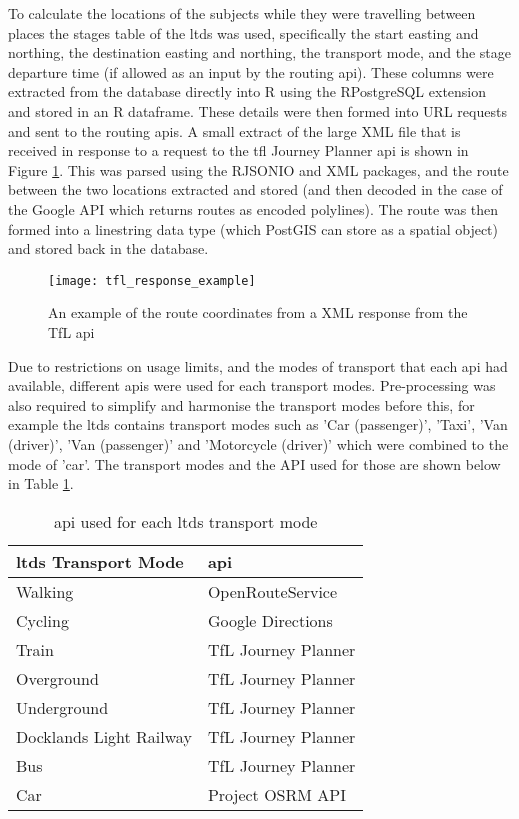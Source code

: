 To calculate the locations of the subjects while they were travelling between places the stages table of the \gls{ltds} was used, specifically the start easting and northing, the destination easting and northing, the transport mode, and the stage departure time (if allowed as an input by the routing \gls{api}). These columns were extracted from the database directly into R using the RPostgreSQL extension and stored in an R dataframe. These details were then formed into URL requests and sent to the routing \gls{api}s. A small extract of the large XML file that is received in response to a request to the \gls{tfl} Journey Planner \gls{api} is shown in Figure \ref{fig:tfl_response_example}. This was parsed using the RJSONIO and XML packages, and the route between the two locations extracted and stored (and then decoded in the case of the Google API which returns routes as encoded polylines). The route was then formed into a linestring data type (which PostGIS can store as a spatial object) and stored back in the database.

\begin{figure}[H]
\centering
\texttt{[image: tfl\_response\_example]}
\caption{An example of the route coordinates from a XML response from the TfL \gls{api}}
\label{fig:tfl_response_example}
\end{figure}

Due to restrictions on usage limits, and the modes of transport that each \gls{api} had available, different \gls{api}s were used for each transport modes. Pre-processing was also required to simplify and harmonise the transport modes before this, for example the \gls{ltds} contains transport modes such as 'Car (passenger)', 'Taxi', 'Van (driver)', 'Van (passenger)' and 'Motorcycle (driver)' which were combined to the mode of 'car'. The transport modes and the API used for those are shown below in Table \ref{tab:api_transport_modes}.

\begin{table}[H]
\caption{\gls{api} used for each \gls{ltds} transport mode}
\centering
    \begin{tabular}{ | l | l |}
    \hline 
     \bfseries{\gls{ltds} Transport Mode} & \bfseries{\gls{api}}  \\ \hline
     Walking                    & OpenRouteService    \\ \hline
     Cycling                    & Google Directions   \\ \hline
     Train                      & TfL Journey Planner \\ \hline
     Overground                 & TfL Journey Planner \\ \hline
     Underground                & TfL Journey Planner \\ \hline
     Docklands Light Railway    & TfL Journey Planner \\ \hline
     Bus                        & TfL Journey Planner \\ \hline
     Car                        & Project OSRM API    \\ \hline
    \end{tabular}
\label{tab:api_transport_modes}
\end{table}

